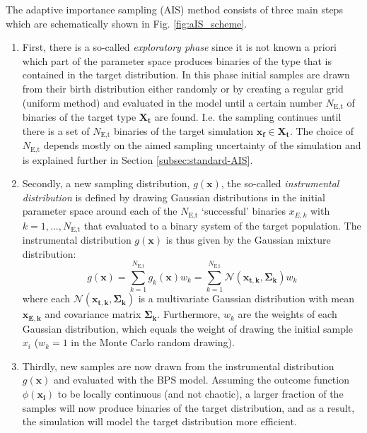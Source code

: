 \documentclass[a4paper,fleqn,usenatbib]{mnras}
\begin{document}
The adaptive importance sampling (AIS) method consists of three main steps which are schematically shown in Fig. \ref{fig:aIS_scheme}. 
\begin{enumerate}
	\item First, there is a so-called  \emph{exploratory phase}     since it is not known a priori which part of the parameter space produces binaries of the type that is contained in the target distribution. In this phase initial samples are drawn from their birth distribution  either randomly or by creating a regular grid (uniform method) and evaluated in the model until a certain number $N_{\text{E,t}}$  of  binaries of the target type $\mathbf{X_t}$ are found. I.e. the sampling continues until  there is a set of $N_{\text{E,t}}$ binaries of the target simulation $\mathbf{x_f} \in  \mathbf{X_t}$. The choice of $N_{\text{E,t}}$ depends mostly on the aimed sampling uncertainty of the simulation and is explained further in Section \ref{subsec:standard-AIS}. 
	\item Secondly, a new sampling distribution, $g(\mathbf{x}) $, the so-called \emph{instrumental distribution} is defined by drawing Gaussian distributions in the initial parameter space around each of the $N_{\text{E,t}}$ `successful' binaries $x_{E,k} $ with $k = 1, ..., N_{\text{E,t}}$ that evaluated to a binary system of the target population.  The instrumental distribution $g(\mathbf{x})$ is thus given by the Gaussian mixture distribution:
	\begin{equation}
	    g(\mathbf{x}) = \sum _{k=1}^{N_{\text{E,t}}}  g_k(\mathbf{x}) w_k =   \sum _{k=1}^{N_{\text{E,t}}}  \mathcal{N}({\boldsymbol {\mathbf{x_{t,k}},\Sigma_{k}}}) w_k 
	\label{eq:instrumental-distribution}
	\end{equation}	 
	where each $\mathcal{N}({\boldsymbol {\mathbf{x_{t,k}},\Sigma _{k}}})$ is a multivariate Gaussian distribution with mean $\mathbf{x_{E,k}}$ and covariance matrix $\mathbf{\Sigma _{k}}$. Furthermore, $w_k$ are the weights of each Gaussian distribution, which equals the weight of drawing the initial sample $x_i$ ($w_k = 1$ in the Monte Carlo random drawing). 
	
	\item Thirdly, new samples are now drawn from the instrumental distribution $g(\mathbf{x}) $ and evaluated with the BPS model.  Assuming the  outcome function $\phi(\mathbf{x_i})$ to be locally continuous (and not chaotic), a larger fraction of the samples will now produce binaries of the target distribution, and as a result, the simulation will model the target distribution more efficient. 
\end{enumerate}
\end{document}
